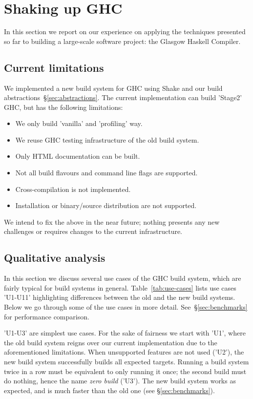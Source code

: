 \section{Shaking up GHC\label{sec:ghc}}

In this section we report on our experience on applying the techniques presented
so far to building a large-scale software project: the Glasgow Haskell Compiler.

\subsection{Current limitations\label{sec:limitations}}

We implemented a new build system for GHC using Shake and our build
abstractions~\S\ref{sec:abstractions}. The current implementation can build
\lst'Stage2' GHC, but has the following limitations:
\begin{itemize}
  \item We only build \lst'vanilla' and \lst'profiling' way.
  \item We reuse GHC testing infrastructure of the old build system.
  \item Only HTML documentation can be built.
  \item Not all build flavours and command line flags are supported.
  \item Cross-compilation is not implemented.
  \item Installation or binary/source distribution are not supported.
\end{itemize}

\noindent We intend to fix the above in the near future; nothing presents any
new challenges or requires changes to the current infrastructure.

\subsection{Qualitative analysis\label{sec:use-cases}}

In this section we discuss several use cases of the GHC build system, which
are fairly typical for build systems in general. Table~\ref{tab:use-cases}
lists use cases \lst'U1-U11' highlighting differences between the old and the
new build systems. Below we go through some of the use cases in more detail.
See~\S\ref{sec:benchmarks} for performance comparison.

\lst'U1-U3' are simplest use cases. For the sake of fairness we start with
\lst'U1', where the old build system reigns over our current implementation due
to the aforementioned limitations. When unsupported features are not used
(\lst'U2'), the new build system successfully builds all expected targets.
Running a build system twice in a row must be equivalent to only running it
once; the second build must do nothing, hence the name \emph{zero
build} (\lst'U3'). The new build system works as expected, and is much faster
than the old one (see \S\ref{sec:benchmarks}).

